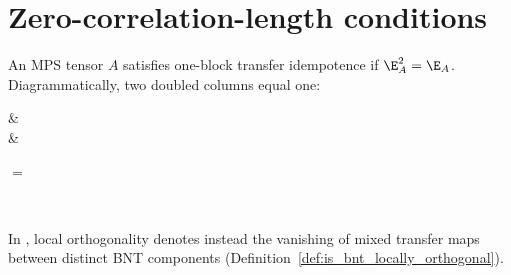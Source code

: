 \section{Zero-correlation-length conditions}

\begin{definition}%
    \label{def:is_locally_orthogonal}
    \leanok
    An MPS tensor $A$ satisfies one-block transfer idempotence if $\E_A^2=\E_A$.
    Diagrammatically, two doubled columns equal one:
    \begin{tenkzequation}
        \tenkzkernel
        \begin{tenkz}[rows={ket,bra}, cols=2, west=open, east=open]
             &  \\
             &
        \end{tenkz}
        $ = $
        \begin{tenkz}[rows={ket,bra}, cols=1, west=open, east=open]
             \\
        \end{tenkz}
    \end{tenkzequation}
    In \cite[Definition~3.5]{Cirac2016MPDO_arXiv}, local orthogonality denotes
    instead the vanishing of mixed transfer maps between distinct BNT components
    (Definition~\ref{def:is_bnt_locally_orthogonal}).
\end{definition}

